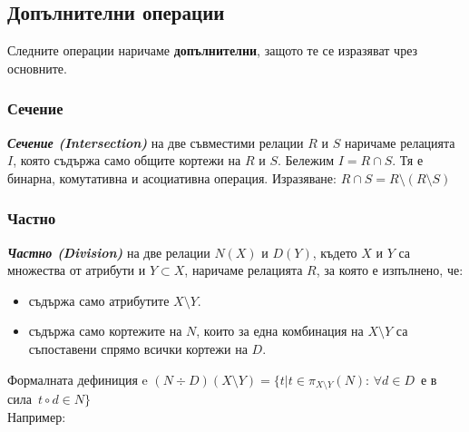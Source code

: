 \documentclass[fleqn,12pt]{article}
\begin{document}
\subsection{Допълнителни операции}
Следните операции наричаме \textbf{допълнителни}, защото те се изразяват чрез основните.

\subsubsection{Сечение}
\textbf{\textit{Сечение (Intersection)}} на две съвместими релации $R$ и $S$ наричаме релацията $I$, която съдържа само общите кортежи на $R$ и $S$.
Бележим $I = R \cap S$.
Тя е бинарна, комутативна и асоциативна операция.
Изразяване: $R \cap S = R \setminus (R \setminus S)$

\subsubsection{Частно}
\textbf{\textit{Частно (Division)}} на две релации $N(X)$ и $D(Y)$, където $X$ и $Y$ са множества от атрибути и $Y \subset X$, наричаме релацията $R$, за която е изпълнено, че:
\begin{itemize}
    \item съдържа само атрибутите $X \setminus Y$.
    \item съдържа само кортежите на $N$, които за една комбинация на $X \setminus Y$ са съпоставени спрямо всички кортежи на $D$.
\end{itemize}


Формалната дефиниция e $(N \div D)(X \setminus Y) = \{t | t \in \pi_{X \setminus Y} (N) :\, \forall d \in D \,$ е в сила $\, t \circ d \in N \}$\\
Например:\\
\end{document}
